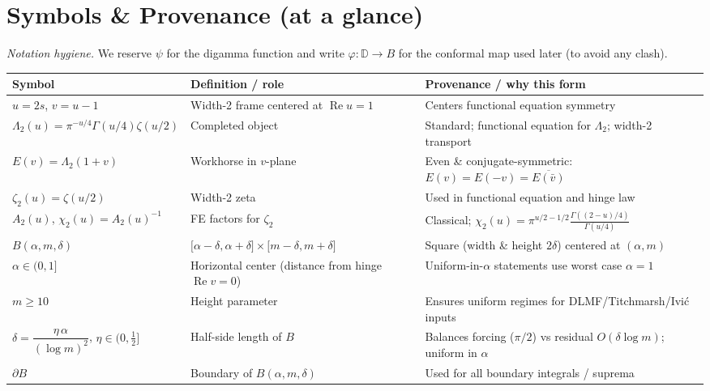 \documentclass[11pt]{article}
\numberwithin{equation}{section}
\theoremstyle{remark}
\newcommand{\D}{\mathbb{D}}
\DeclareMathOperator{\Real}{Re}
\newcommand{\LamTwo}{\Lambda_2}
\newcommand{\chiTwo}{\chi_2}
\begin{document}
\section*{Symbols \& Provenance (at a glance)}\label{sec:symbols}

\noindent\textit{Notation hygiene.} We reserve $\psi$ for the digamma function and write $\varphi:\D\to B$ for the conformal map used later (to avoid any clash).

\medskip

\begingroup
\setlength{\tabcolsep}{6pt}
\renewcommand{\arraystretch}{1.12}
\small
\begin{tabularx}{\textwidth}{|p{3.0cm}|L|L|}
\hline
\textbf{Symbol} & \textbf{Definition / role} & \textbf{Provenance / why this form}\\
\hline
$u=2s$, $v=u-1$ & Width-2 frame centered at $\Real u=1$ & Centers functional equation symmetry\\
\hline
$\LamTwo(u)=\pi^{-u/4}\Gamma(u/4)\zeta(u/2)$ & Completed object & Standard; functional equation for $\LamTwo$; width-2 transport\\
\hline
$E(v)=\LamTwo(1+v)$ & Workhorse in $v$-plane & Even \& conjugate-symmetric: $E(v)=E(-v)=\overline{E(\bar v)}$\\
\hline
$\zeta_2(u)=\zeta(u/2)$ & Width-2 zeta & Used in functional equation and hinge law\\
\hline
$A_2(u)$, $\chiTwo(u)=A_2(u)^{-1}$ & FE factors for $\zeta_2$ & Classical; $\chiTwo(u)=\pi^{u/2-1/2}\frac{\Gamma((2-u)/4)}{\Gamma(u/4)}$\\
\hline
$B(\alpha,m,\delta)$ & $\big[\alpha-\delta,\alpha+\delta\big]\times\big[m-\delta,m+\delta\big]$ & Square (width \& height $2\delta$) centered at $(\alpha,m)$\\
\hline
$\alpha\in(0,1]$ & Horizontal center (distance from hinge $\Real v=0$) & Uniform-in-$\alpha$ statements use worst case $\alpha=1$\\
\hline
$m\ge 10$ & Height parameter & Ensures uniform regimes for DLMF/Titchmarsh/Ivi\'c inputs\\
\hline
$\delta=\dfrac{\eta\,\alpha}{(\log m)^2}$, $\eta\in(0,\tfrac12]$ & Half-side length of $B$ & Balances forcing ($\pi/2$) vs residual $O(\delta\log m)$; uniform in $\alpha$\\
\hline
$\partial B$ & Boundary of $B(\alpha,m,\delta)$ & Used for all boundary integrals / suprema\\

\end{tabularx}
\end{document}
